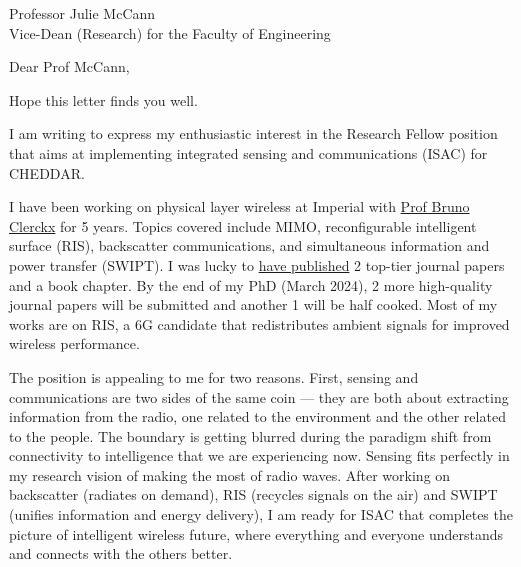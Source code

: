 \documentclass[10pt]{scrartcl}
\begin{document}

\begin{letter}{%
		Professor Julie McCann\\
		Vice-Dean (Research) for the Faculty of Engineering
	}
	\opening{Dear Prof McCann,}

	Hope this letter finds you well.

	I am writing to express my enthusiastic interest in the Research Fellow position that aims at implementing integrated sensing and communications (ISAC) for CHEDDAR.

	I have been working on physical layer wireless at Imperial with \href{https://www.imperial.ac.uk/people/b.clerckx}{Prof Bruno Clerckx} for 5 years.
	Topics covered include MIMO, reconfigurable intelligent surface (RIS), backscatter communications, and simultaneous information and power transfer (SWIPT).
	I was lucky to \href{https://scholar.google.co.uk/citations?user=ckmF3VsAAAAJ&hl=en}{have published} 2 top-tier journal papers and a book chapter.
	By the end of my PhD (March 2024), 2 more high-quality journal papers will be submitted and another 1 will be half cooked.
	Most of my works are on RIS, a 6G candidate that redistributes ambient signals for improved wireless performance.

	The position is appealing to me for two reasons.
	First, sensing and communications are two sides of the same coin --- they are both about extracting information from the radio, one related to the environment and the other related to the people.
	The boundary is getting blurred during the paradigm shift from connectivity to intelligence that we are experiencing now.
	Sensing fits perfectly in my research vision of making the most of radio waves.
	After working on backscatter (radiates on demand), RIS (recycles signals on the air) and SWIPT (unifies information and energy delivery), I am ready for ISAC that completes the picture of intelligent wireless future, where everything and everyone understands and connects with the others better.


\end{letter}
\end{document}
